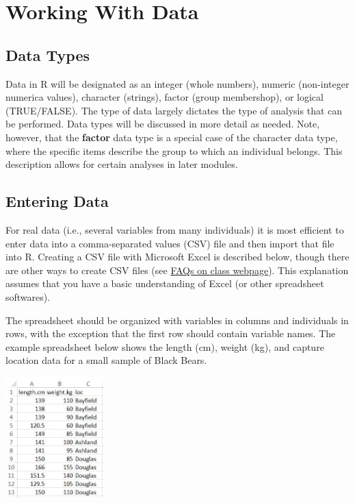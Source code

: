 \documentclass[10pt,openany]{book}\usepackage[]{graphicx}\usepackage[]{color}
\begin{document}
\section{Working With Data}
\subsection{Data Types}  \label{sect:RDataTypes}
Data in R will be designated as an integer (whole numbers), numeric (non-integer numerica values), character (strings), factor (group membershop), or logical (TRUE/FALSE).  The type of data largely dictates the type of analysis that can be performed.  Data types will be discussed in more detail as needed.  Note, however, that the \textbf{factor} data type is a special case of the character data type, where the specific items describe the group to which an individual belongs.  This description allows for certain analyses in later modules.



\subsection{Entering Data}  \label{sect:REnterData}
For real data (i.e., several variables from many individuals) it is most efficient to enter data into a comma-separated values (CSV) file and then import that file into R.  Creating a CSV file with Microsoft Excel is described below, though there are other ways to create CSV files (see \href{http://derekogle.com/NCMTH107/resources/FAQ/}{FAQs on class webpage}).  This explanation assumes that you have a basic understanding of Excel (or other spreadsheet softwares).


The spreadsheet should be organized with variables in columns and individuals in rows, with the exception that the first row should contain variable names.  The example spreadsheet below shows the length (cm), weight (kg), and capture location data for a small sample of Black Bears.

\begin{center}
  \includegraphics[width=1.5in]{Figs/Data_File_1.jpg}
\end{center}
\end{document}
